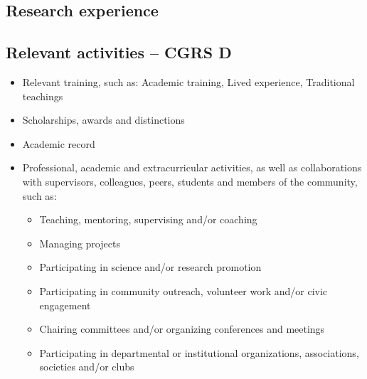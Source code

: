 \documentclass{article}
\begin{document}
\subsection*{Research experience}

\subsection*{Relevant activities – CGRS D}

\begin{itemize}
    \item Relevant training, such as: Academic training, Lived experience, Traditional teachings

    \item Scholarships, awards and distinctions

    \item Academic record

    \item Professional, academic and extracurricular activities, as well as collaborations with supervisors, colleagues, peers, students and members of the community, such as:
    \begin{itemize}
        \item Teaching, mentoring, supervising and/or coaching
        \item Managing projects
        \item Participating in science and/or research promotion
        \item Participating in community outreach, volunteer work and/or civic engagement
        \item Chairing committees and/or organizing conferences and meetings
        \item Participating in departmental or institutional organizations, associations, societies and/or clubs
    \end{itemize}
\end{itemize}


%
\end{document}
